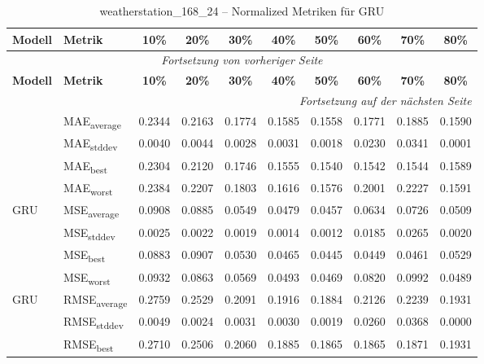{\small
\begin{longtable}{l l c c c c c c c c}
    \toprule
    \textbf{Modell} & \textbf{Metrik} & \textbf{10\%} & \textbf{20\%} & \textbf{30\%} & \textbf{40\%} & \textbf{50\%} & \textbf{60\%} & \textbf{70\%} & \textbf{80\%} \\
    \midrule
    \endfirsthead
    \multicolumn{10}{c}{\textit{Fortsetzung von vorheriger Seite}} \\
    \toprule
    \textbf{Modell} & \textbf{Metrik} & \textbf{10\%} & \textbf{20\%} & \textbf{30\%} & \textbf{40\%} & \textbf{50\%} & \textbf{60\%} & \textbf{70\%} & \textbf{80\%} \\
    \midrule
    \endhead
    \midrule
    \multicolumn{10}{r}{\textit{Fortsetzung auf der nächsten Seite}} \\
    \midrule
    \endfoot
    \bottomrule
    \caption{weatherstation_168_24 -- Normalized Metriken für GRU}
    \label{tab:weatherstation_168_24_normalized_gru}
    \endlastfoot
\multirow{4}{*}{GRU} & MAE\textsubscript{average} & 0.2344 & 0.2163 & 0.1774 & 0.1585 & 0.1558 & 0.1771 & 0.1885 & 0.1590 \\
 & MAE\textsubscript{stddev} & 0.0040 & 0.0044 & 0.0028 & 0.0031 & 0.0018 & 0.0230 & 0.0341 & 0.0001 \\
 & MAE\textsubscript{best} & 0.2304 & 0.2120 & 0.1746 & 0.1555 & 0.1540 & 0.1542 & 0.1544 & 0.1589 \\
 & MAE\textsubscript{worst} & 0.2384 & 0.2207 & 0.1803 & 0.1616 & 0.1576 & 0.2001 & 0.2227 & 0.1591 \\
\cmidrule(lr){2-10}
\multirow{4}{*}{GRU} & MSE\textsubscript{average} & 0.0908 & 0.0885 & 0.0549 & 0.0479 & 0.0457 & 0.0634 & 0.0726 & 0.0509 \\
 & MSE\textsubscript{stddev} & 0.0025 & 0.0022 & 0.0019 & 0.0014 & 0.0012 & 0.0185 & 0.0265 & 0.0020 \\
 & MSE\textsubscript{best} & 0.0883 & 0.0907 & 0.0530 & 0.0465 & 0.0445 & 0.0449 & 0.0461 & 0.0529 \\
 & MSE\textsubscript{worst} & 0.0932 & 0.0863 & 0.0569 & 0.0493 & 0.0469 & 0.0820 & 0.0992 & 0.0489 \\
\cmidrule(lr){2-10}
\multirow{4}{*}{GRU} & RMSE\textsubscript{average} & 0.2759 & 0.2529 & 0.2091 & 0.1916 & 0.1884 & 0.2126 & 0.2239 & 0.1931 \\
 & RMSE\textsubscript{stddev} & 0.0049 & 0.0024 & 0.0031 & 0.0030 & 0.0019 & 0.0260 & 0.0368 & 0.0000 \\
 & RMSE\textsubscript{best} & 0.2710 & 0.2506 & 0.2060 & 0.1885 & 0.1865 & 0.1865 & 0.1871 & 0.1931 \\

\end{longtable}}
